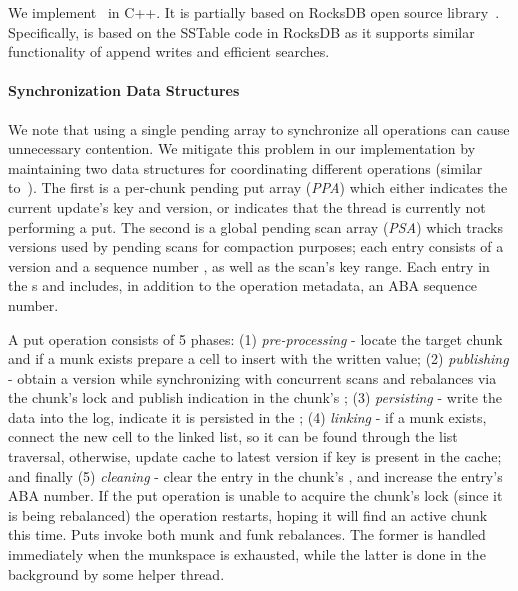 We implement \sys\ in C++. It is partially based on RocksDB open source library~\cite{rocksdb}.
Specifically,  is based on the SSTable code in RocksDB as it supports similar functionality of append writes and efficient searches. 

\paragraph{Synchronization Data Structures}
We note that using a single pending array to synchronize all
operations can cause unnecessary contention.
We mitigate this problem in our implementation by maintaining two data structures for coordinating different operations (similar to~\cite{kiwi}). The first is a per-chunk pending put array (\emph{PPA}) which 
either indicates the current update's key and version, or indicates that the thread is currently not performing a put.
The second is a global pending scan array (\emph{PSA}) which tracks versions used by pending scans for compaction purposes; each entry consists of a version  and a sequence number , as well as the scan’s key range. Each entry in the s and  includes, in addition to the operation metadata, an ABA sequence number. 

A put operation consists of 5 phases: (1) \emph{pre-processing} - locate the target chunk and if a munk exists prepare a cell to insert with the written value; (2) \emph{publishing} - obtain a version while synchronizing with concurrent scans and rebalances via the chunk's lock and publish indication in the chunk's ; (3) \emph{persisting} - write the data into the log, indicate it is persisted in the ; (4) \emph{linking} - if a munk exists, connect the new cell to the linked list, so it can be found through the list traversal, otherwise, update cache to latest version if key is present in the cache; and finally (5) \emph{cleaning} - clear the entry in the chunk's , and increase the entry's ABA number.
If the put operation is unable to acquire the chunk's lock (since it is being rebalanced) the operation restarts, hoping it will find an active chunk this time.
Puts invoke both munk and funk rebalances. The former is handled immediately when the munkspace is exhausted, while the latter is done in the background by some helper thread.

